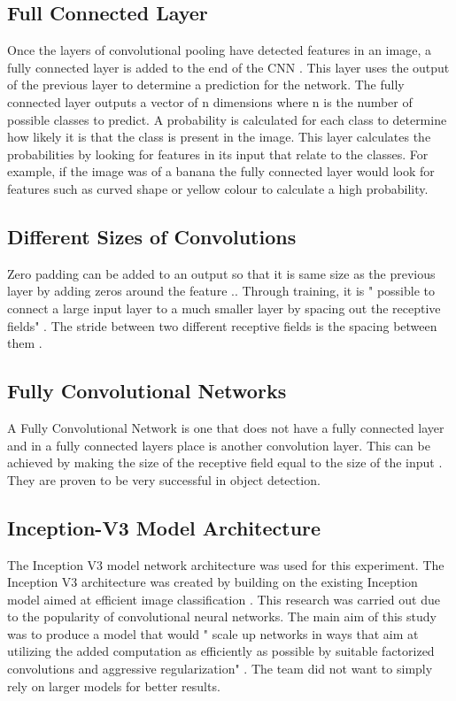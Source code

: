 \tocless\subsection{Full Connected Layer}
Once the layers of convolutional pooling have detected features in an image, a fully connected layer is added to the end of the CNN \parencite{fullyConnectedLayer}.
This layer uses the output of the previous layer to determine a prediction for the network.
The fully connected layer outputs a vector of n dimensions where n is the number of possible classes to predict.
A probability is calculated for each class to determine how likely it is that the class is present in the image.
This layer calculates the probabilities by looking for features in its input that relate to the classes.
For example, if the image was of a banana the fully connected layer would look for features such as curved shape or yellow colour to calculate a high probability.

\tocless\subsection{Different Sizes of Convolutions}
Zero padding can be added to an output so that it is same size as the previous layer by adding zeros around the feature \parencite{handsOnML}..
Through training, it is " possible to connect a large input layer to a much smaller layer by spacing out the receptive fields" \parencite{handsOnML}.
The stride between two different receptive fields is the spacing between them \parencite{handsOnML}.

\tocless\subsection{Fully Convolutional Networks}
A Fully Convolutional Network is one that does not have a fully connected layer
and in a fully connected layers place is another convolution layer.
This can be achieved by making the size of the receptive field equal to the size of the input \parencite{digits}.
They are proven to be very successful in object detection.

\tocless\subsection{Inception-V3 Model Architecture}
The Inception V3 model network architecture was used for this experiment. The
Inception V3 architecture was created by building on the existing Inception
model aimed at efficient image classification \parencite{rethinkingInception}.
This research was carried out due to the popularity of convolutional neural networks.
The main aim of this study was to produce a model that would " scale up networks in ways that aim at utilizing the added computation as efficiently as possible by suitable factorized convolutions and aggressive regularization" \parencite{rethinkingInception}.
The team did not want to simply rely on larger models for better results.

